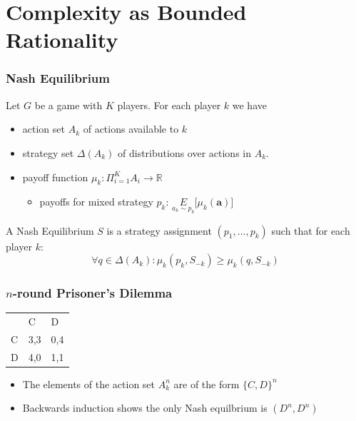 \documentclass{beamer}
\begin{document}
\section{Complexity as Bounded Rationality}

\begin{frame}
	\frametitle{Nash Equilibrium}
	Let $G$ be a game with $K$ players. For each player $k$ we have
	\begin{itemize}
		\item action set $A_k$ of actions available to $k$
		\item strategy set $\Delta(A_k)$ of distributions over actions in $A_k$.
		\item payoff function $\mu_k: \Pi_{i=1}^K A_i \longrightarrow \mathbb{R}$
		\begin{itemize}
			\item payoffs for mixed strategy $p_k$: $\underset{a_k \sim p_k}{E}\lbrack \mu_k(\textbf{a}) \rbrack$
		\end{itemize}
	\end{itemize}
	
	A Nash Equilibrium $S$ is a strategy assignment $(p_1,..., p_k)$ such that for each player $k$:
	\begin{equation}
	\forall q \in \Delta(A_k): \mu_k(p_k, S_{-k}) \ge \mu_k(q, S_{-k})
	\end{equation}
	
\end{frame}

\begin{frame}
	\frametitle{$n$-round Prisoner's Dilemma}
	\begin{table}[H]
		\centering
		\label{pdpayoffs}
		\begin{tabular}{lll}
			& C                        & D                        \\ \cline{2-3} 
			\multicolumn{1}{l|}{C} & \multicolumn{1}{l|}{3,3} & \multicolumn{1}{l|}{0,4} \\ \cline{2-3} 
			\multicolumn{1}{l|}{D} & \multicolumn{1}{l|}{4,0} & \multicolumn{1}{l|}{1,1} \\ \cline{2-3} 
		\end{tabular}
	\end{table}
	
	\begin{itemize}
		\item The elements of the action set $A^n_k$ are of the form $\lbrace C,D \rbrace^n$
		\item Backwards induction shows the only Nash equilbrium is $(D^n, D^n)$
	\end{itemize}
\end{frame}
\end{document}
